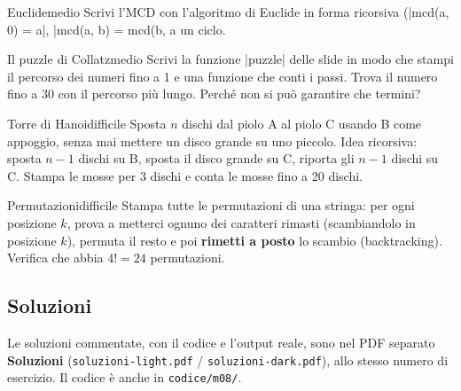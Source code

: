 \begin{esercizio}{Euclide}{medio}
Scrivi l'MCD con l'algoritmo di Euclide in forma ricorsiva (\cc|mcd(a, 0) = a|,
\cc|mcd(a, b) = mcd(b, a %
un ciclo.
\end{esercizio}

\begin{esercizio}{Il puzzle di Collatz}{medio}
Scrivi la funzione \cc|puzzle| delle slide in modo che stampi il percorso dei numeri
fino a 1 e una funzione che conti i passi. Trova il numero fino a 30 con il percorso
più lungo. Perché non si può garantire che termini?
\end{esercizio}

\begin{esercizio}{Torre di Hanoi}{difficile}
Sposta $n$ dischi dal piolo A al piolo C usando B come appoggio, senza mai mettere
un disco grande su uno piccolo. Idea ricorsiva: sposta $n-1$ dischi su B, sposta il
disco grande su C, riporta gli $n-1$ dischi su C. Stampa le mosse per 3 dischi e
conta le mosse fino a 20 dischi.
\end{esercizio}

\begin{esercizio}{Permutazioni}{difficile}
Stampa tutte le permutazioni di una stringa: per ogni posizione $k$, prova a
metterci ognuno dei caratteri rimasti (scambiandolo in posizione $k$), permuta il
resto e poi \textbf{rimetti a posto} lo scambio (backtracking). Verifica che
 abbia $4! = 24$ permutazioni.
\end{esercizio}

\subsection*{Soluzioni}
Le soluzioni commentate, con il codice e l'output reale, sono nel PDF separato
\textbf{Soluzioni} (\texttt{soluzioni-light.pdf} / \texttt{soluzioni-dark.pdf}),
allo stesso numero di esercizio. Il codice è anche in \texttt{codice/m08/}.
